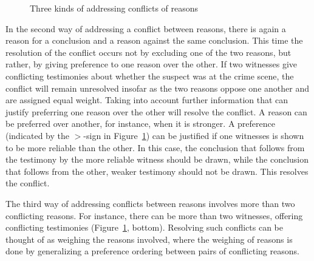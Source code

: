 \documentclass[10pt]{article}
\begin{document}

\begin{figure}[bt]
\centering

\caption{Three kinds of addressing conflicts of reasons\label{fig:conflicts}}
\end{figure}

In the second way of addressing a conflict between reasons, there is again a reason for a conclusion 
and a reason against the same conclusion. This time the resolution of the conflict
occurs not by excluding one of the two reasons, but rather, by giving preference to one reason over the other.
If two witnesses give conflicting testimonies about whether the suspect was at the crime scene, 
the conflict will remain unresolved insofar as the 
two reasons oppose one another and are assigned equal weight. %
Taking into account further information that can justify preferring one 
reason over the other will resolve the conflict. A reason can be preferred over another, for instance, when it is stronger. 
A preference (indicated by the $>$-sign in Figure~\ref{fig:conflicts}) 
can be justified if one witnesses is shown to be more reliable than the other. In this case, the conclusion that 
follows from the testimony by the more reliable witness should be drawn, while the conclusion that follows from the other, weaker 
testimony should not be drawn. This resolves the conflict. 

The third way of addressing conflicts between reasons involves 
more than two conflicting reasons. For instance, there can be more 
than two witnesses, offering conflicting testimonies (Figure~\ref{fig:conflicts}, bottom). %
Resolving such conflicts can be thought of as 
weighing the reasons involved, where the weighing of reasons 
is done by generalizing a preference ordering between pairs of conflicting reasons. 

\end{document}
